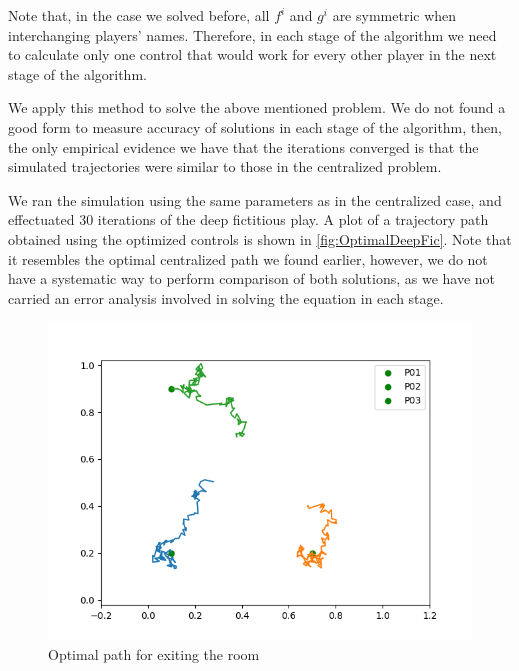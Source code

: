 Note that, in the case we solved before, all $f^i$ and $g^i$ are symmetric when interchanging players' names. Therefore, in each stage of the algorithm we need to calculate only one control that would work for every other player in the next stage of the algorithm.  

We apply this method to solve the above mentioned problem. We do not found a good form to measure accuracy of solutions in each stage of the algorithm, then, the only empirical evidence we have that the iterations converged is that the simulated trajectories were similar to those in the centralized problem. 

We ran the simulation using the same parameters as in the centralized case, and effectuated 30 iterations of the deep fictitious play. A plot of a trajectory path obtained using the optimized controls is shown in \autoref{fig:OptimalDeepFic}. Note that it resembles the optimal centralized path we found earlier, however, we do not have a systematic way to perform comparison of both solutions, as we have not carried an error analysis involved in solving the equation in each stage.

\begin{figure}[H]
	\centering
	\includegraphics[width=0.7\linewidth]{images/OptimalLQRDeepFictitus.png}
	\caption{Optimal path for exiting the room}
	\label{fig:OptimalDeepFic}
\end{figure}

